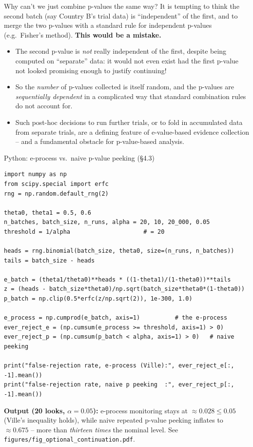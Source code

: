 \documentclass[aspectratio=169,10pt]{beamer}
\begin{document}
\begin{frame}{Why can't we just combine p-values the same way?}
  It is tempting to think the second batch (say Country B's trial data) is
  ``independent'' of the first, and to merge the two p-values with a
  standard rule for independent p-values (e.g.\ Fisher's method).
  \textbf{This would be a mistake.}
  \begin{itemize}
    \item The second p-value is \emph{not} really independent of the first,
    despite being computed on ``separate'' data: it would not even exist had
    the first p-value not looked promising enough to justify continuing!
    \item So the \emph{number} of p-values collected is itself random, and
    the p-values are \emph{sequentially dependent} in a complicated way that
    standard combination rules do not account for.
    \item Such post-hoc decisions to run further trials, or to fold in
    accumulated data from separate trials, are a defining feature of
    e-value-based evidence collection -- and a fundamental obstacle for
    p-value-based analysis.
  \end{itemize}
\end{frame}

\begin{frame}[fragile]{Python: e-process vs.\ naive p-value peeking (\S4.3)}
\begin{lstlisting}
import numpy as np
from scipy.special import erfc
rng = np.random.default_rng(2)

theta0, theta1 = 0.5, 0.6
n_batches, batch_size, n_runs, alpha = 20, 10, 20_000, 0.05
threshold = 1/alpha                     # = 20

heads = rng.binomial(batch_size, theta0, size=(n_runs, n_batches))
tails = batch_size - heads

e_batch = (theta1/theta0)**heads * ((1-theta1)/(1-theta0))**tails
z = (heads - batch_size*theta0)/np.sqrt(batch_size*theta0*(1-theta0))
p_batch = np.clip(0.5*erfc(z/np.sqrt(2)), 1e-300, 1.0)

e_process = np.cumprod(e_batch, axis=1)          # the e-process
ever_reject_e = (np.cumsum(e_process >= threshold, axis=1) > 0)
ever_reject_p = (np.cumsum(p_batch < alpha, axis=1) > 0)   # naive peeking

print("false-rejection rate, e-process (Ville):", ever_reject_e[:, -1].mean())
print("false-rejection rate, naive p peeking  :", ever_reject_p[:, -1].mean())
\end{lstlisting}
  \textbf{Output (20 looks, $\alpha=0.05$):} e-process monitoring stays at
  $\approx 0.028\le 0.05$ (Ville's inequality holds), while naive repeated
  p-value peeking inflates to $\approx 0.675$ -- more than \emph{thirteen
  times} the nominal level. See \texttt{figures/fig\_optional\_continuation.pdf}.
\end{frame}
\end{document}
